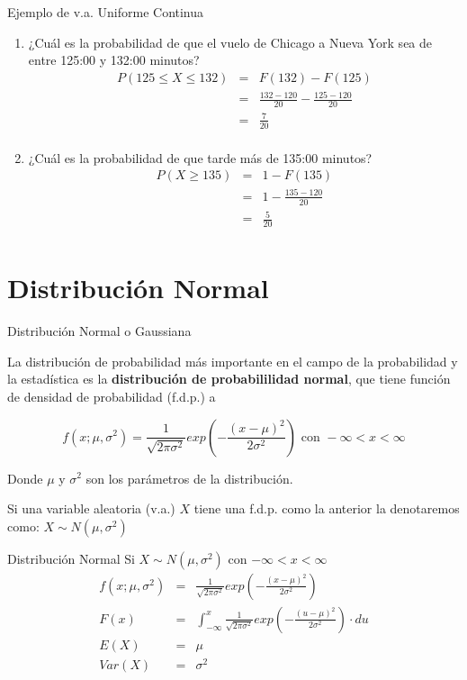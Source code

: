 \documentclass[11pt]{beamer}
\begin{document}
\begin{frame}{Ejemplo de v.a. Uniforme Continua}
\begin{enumerate}
\item ¿Cuál es la probabilidad de que el vuelo de Chicago a Nueva York sea de entre  125:00  y 132:00 minutos?
\begin{eqnarray*}
P( 125 \le X \le 132 ) &=&  F(132) - F(125)\\
&=& \frac{132-120 }{20 } -  \frac{125-120 }{20 }   \\
 &=&  \frac{7 }{20 }  \\
\end{eqnarray*}
\item ¿Cuál es la probabilidad de que tarde más de 135:00 minutos? 
\begin{eqnarray*}
P( X \ge 135 ) &=& 1-  F(135) \\
&=& 1  -  \frac{135-120 }{20 }   \\
 &=& \frac{ 5 }{20 }  \\
\end{eqnarray*}
\end{enumerate}
\end{frame}
\section{Distribución Normal}



\begin{frame}{Distribuci\'on Normal o Gaussiana}

La distribuci\'on de probabilidad m\'as importante en el campo de la probabilidad y la estad\'istica es la {\bf distribuci\'on de probabililidad normal}, que tiene funci\'on de densidad de probabilidad (f.d.p.) a

$$f\left( x;\mu ,{ \sigma  }^{ 2 } \right) =\frac { 1 }{ \sqrt { 2\pi { \sigma  }^{ 2 } }  } exp\left( -\frac { { \left( x-\mu  \right)  }^{ 2 } }{ 2{ \sigma  }^{ 2 } }  \right) \mbox{ con }-\infty <x<\infty $$

Donde $\mu$  y ${ \sigma  }^{ 2 }$ son los par\'ametros de la distribuci\'on.

 \bigskip
Si una variable aleatoria (v.a.) $X$ tiene una f.d.p. como la anterior la denotaremos como: $X\sim N(\mu ,{ \sigma  }^{ 2 }) $ 
\end{frame}


\begin{frame}{Distribución Normal}
Si $X\sim N(\mu ,{ \sigma  }^{ 2 }) $  con $-\infty <x<\infty$
\begin{eqnarray*}
f\left( x;\mu ,{ \sigma  }^{ 2 } \right) &=&\frac { 1 }{ \sqrt { 2\pi { \sigma  }^{ 2 } }  } exp\left( -\frac { { \left( x-\mu  \right)  }^{ 2 } }{ 2{ \sigma  }^{ 2 } }  \right)   \\
F( x ) &=& \int_{- \infty}^{x} \frac { 1 }{ \sqrt { 2\pi { \sigma  }^{ 2 } }  } exp\left( -\frac { { \left( u-\mu  \right)  }^{ 2 } }{ 2{ \sigma  }^{ 2 } }   \right) \cdot du  \\
E(X) &=& \mu \\
Var(X) &=& \sigma^2 
\end{eqnarray*}
\end{frame}
\end{document}
